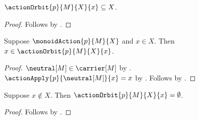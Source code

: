 \begin{proposition}\label{action_orbit_subseteq}
    $\actionOrbit{p}{M}{X}{x}\subseteq X$.
\end{proposition}
\begin{proof}
    Follows by .
\end{proof}

\begin{proposition}\label{action_orbit_contains_point}
    Suppose $\monoidAction{p}{M}{X}$ and $x\in X$.
    Then $x\in\actionOrbit{p}{M}{X}{x}$.
\end{proposition}
\begin{proof}
    $\neutral[M]\in\carrier[M]$ by
        .
    $\actionApply{p}{\neutral[M]}{x}=x$ by
        .
    Follows by .
\end{proof}

\begin{proposition}\label{action_orbit_off_carrier}
    Suppose $x\notin X$.
    Then $\actionOrbit{p}{M}{X}{x}=\emptyset$.
\end{proposition}
\begin{proof}
    Follows by .
\end{proof}
